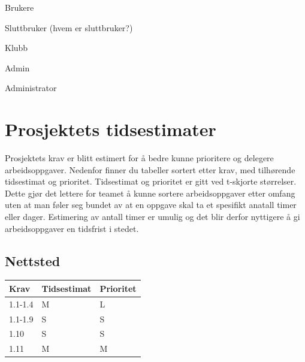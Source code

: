 \documentclass[norsk]{article}
\begin{document}
\begin{legal}
\begin{legal}
    \end{legal}
    \item Brukere
    \begin{legal}
        \item Sluttbruker (hvem er sluttbruker?)
        \item Klubb
        \item Admin
    \end{legal}
    
    \item Administrator
\end{legal}

\section{Prosjektets tidsestimater}
Prosjektets krav er blitt estimert for å bedre kunne prioritere og delegere arbeidsoppgaver. Nedenfor finner du tabeller sortert etter krav, med tilhørende tidsestimat og prioritet.\newline
Tidsestimat og prioritet er gitt ved t-skjorte størrelser. Dette gjør det lettere for teamet å kunne sortere arbeidsoppgaver etter omfang uten at man føler seg bundet av at en oppgave skal ta et spesifikt anatall timer eller dager. Estimering av antall timer er umulig og det blir derfor nyttigere å gi arbeidsoppgaver en tidsfrist i stedet.
\subsection{Nettsted}
\begin{table}[h]
\begin{tabular}{|l|l|l|}
\hline
Krav              & Tidsestimat & Prioritet \\ \hline
1.1-1.4 & M           & L         \\ \hline
1.1-1.9     & S           & S         \\ \hline
1.10              & S           & S         \\ \hline
1.11              & M           & M         \\ \hline
\end{tabular}
\end{table}
\end{document}
